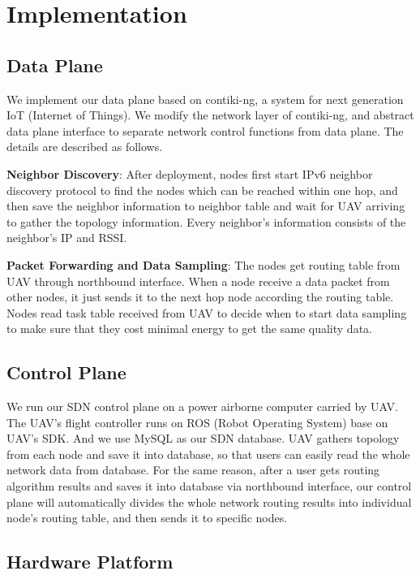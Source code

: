 \section{Implementation}
\label{Imp}

\subsection{Data Plane}

We implement our data plane based on contiki-ng, a system for next generation IoT (Internet of
Things). We modify the network layer of contiki-ng, and abstract
data plane interface to separate network control functions from data plane. 
The details are described as follows.

\textbf{Neighbor Discovery}: After deployment, nodes first start IPv6 neighbor
discovery protocol to find the nodes which can be reached within one hop, and
then save the neighbor information to neighbor table and wait for UAV arriving
to gather the topology information. Every neighbor's information consists of the
neighbor's IP and RSSI.

\textbf{Packet Forwarding and Data Sampling}: The nodes get routing table from UAV through
northbound interface. When a node receive a data packet from other nodes, it
just sends it to the next hop node according the routing table. Nodes read task
table received from UAV to decide when to start data sampling to make sure 
that they cost minimal energy to get the same quality data. 

\subsection{Control Plane}

We run our SDN control plane on a power airborne computer carried by UAV. 
The UAV's flight controller runs on ROS (Robot Operating System) base on UAV's SDK.
And we use MySQL as our SDN database. UAV gathers topology from each node and save
it into database, so that users can easily read the whole network data from
database. For the same reason, after a user gets routing algorithm results and
saves it into database via northbound interface, our control plane will
automatically divides the whole network routing results into individual node's
routing table, and then sends it to specific nodes.

\subsection{Hardware Platform}

